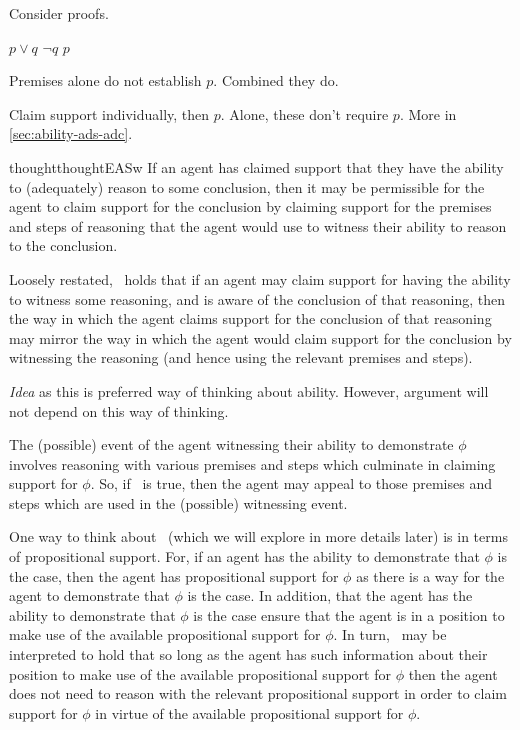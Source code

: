 \begin{note}
  Consider proofs.

  \(p \lor q\)
  \(\lnot q\)
  \(p\)

  Premises alone do not establish \(p\).
  Combined they do.

  Claim support individually, then \(p\).
  Alone, these don't require \(p\).
  More in \autoref{sec:ability-ads-adc}.
\end{note}

\begin{note}[\EASw{}]
    \begin{restatable}[\EASw{-} --- \EASw{}]{thought}{thoughtEASw}\label{thought:EASw}
    If an agent has claimed support that they have the ability to (adequately) reason to some conclusion, then it may be permissible for the agent to claim support for the conclusion by claiming support for the premises and steps of reasoning that the agent would use to witness their ability to reason to the conclusion.
  \end{restatable}

  Loosely restated,~\EASw{} holds that if an agent may claim support for having the ability to witness some reasoning, and is aware of the conclusion of that reasoning, then the way in which the agent claims support for the conclusion of that reasoning may mirror the way in which the agent would claim support for the conclusion by witnessing the reasoning (and hence using the relevant premises and steps).
\end{note}

\begin{note}
  \emph{Idea} as this is preferred way of thinking about ability.
  However, argument will not depend on this way of thinking.
\end{note}

\begin{note}
  The (possible) event of the agent witnessing their ability to demonstrate \(\phi\) involves reasoning with various premises and steps which culminate in claiming support for \(\phi\).
  So, if~\EASw{} is true, then the agent may appeal to those premises and steps which are used in the (possible) witnessing event.

  One way to think about~\EASw{} (which we will explore in more details later) is in terms of propositional support.
  For, if an agent has the ability to demonstrate that \(\phi\) is the case, then the agent has propositional support for \(\phi\) as there is a way for the agent to demonstrate that \(\phi\) is the case.
  In addition, that the agent has the ability to demonstrate that \(\phi\) is the case ensure that the agent is in a position to make use of the available propositional support for \(\phi\).
  In turn,~\EAS{} may be interpreted to hold that so long as the agent has such information about their position to make use of the available propositional support for \(\phi\) then the agent does not need to reason with the relevant propositional support in order to claim support for \(\phi\) in virtue of the available propositional support for \(\phi\).
\end{note}

